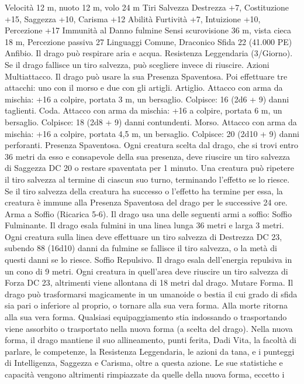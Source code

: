 \begin{multicols}{2}
Velocità 12 m, nuoto 12 m, volo 24 m
Tiri Salvezza Destrezza +7, Costituzione +15, Saggezza +10,
Carisma +12
Abilità Furtività +7, Intuizione +10, Percezione +17
Immunità al Danno fulmine
Sensi scurovisione 36 m, vista cieca 18 m, Percezione passiva 27
Linguaggi Comune, Draconico
Sfida 22 (41.000 PE)
Anfibio. Il drago può respirare aria e acqua.
Resistenza Leggendaria (3/Giorno). Se il drago fallisce un tiro
salvezza, può scegliere invece di riuscire.
Azioni
Multiattacco. Il drago può usare la sua Presenza Spaventosa. Poi
effettuare tre attacchi: uno con il morso e due con gli artigli.
Artiglio. Attacco con arma da mischia: +16 a colpire, portata 3
m, un bersaglio.
Colpisce: 16 (2d6 + 9) danni taglienti.
Coda. Attacco con arma da mischia: +16 a colpire, portata 6 m,
un bersaglio.
Colpisce: 18 (2d8 + 9) danni contundenti.
Morso. Attacco con arma da mischia: +16 a colpire, portata 4,5
m, un bersaglio.
Colpisce: 20 (2d10 + 9) danni perforanti.
Presenza Spaventosa. Ogni creatura scelta dal drago, che si trovi
entro 36 metri da esso e consapevole della sua presenza, deve
riuscire un tiro salvezza di Saggezza DC 20 o restare spaventata per
1 minuto. Una creatura può ripetere il tiro salvezza al termine di
ciascun suo turno, terminando l’effetto se lo riesce. Se il tiro salvezza
della creatura ha successo o l’effetto ha termine per essa, la creatura è
immune alla Presenza Spaventosa del drago per le successive 24 ore.
Arma a Soffio (Ricarica 5-6). Il drago usa una delle seguenti armi
a soffio:
Soffio Fulminante. Il drago esala fulmini in una linea lunga 36 metri
e larga 3 metri. Ogni creatura sulla linea deve effettuare un tiro
salvezza di Destrezza DC 23, subendo 88 (16d10) danni da fulmine
se fallisce il tiro salvezza, o la metà di questi danni se lo riesce.
Soffio Repulsivo. Il drago esala dell’energia repulsiva in un cono di 9
metri. Ogni creatura in quell’area deve riuscire un tiro salvezza di
Forza DC 23, altrimenti viene allontana di 18 metri dal drago.
Mutare Forma. Il drago può trasformarsi magicamente in un
umanoide o bestia il cui grado di sfida sia pari o inferiore al proprio,
o tornare alla sua vera forma. Alla morte ritorna alla sua vera forma.
Qualsiasi equipaggiamento stia indossando o trasportando viene
assorbito o trasportato nella nuova forma (a scelta del drago).
Nella nuova forma, il drago mantiene il suo allineamento, punti
ferita, Dadi Vita, la facoltà di parlare, le competenze, la Resistenza
Leggendaria, le azioni da tana, e i punteggi di Intelligenza, Saggezza
e Carisma, oltre a questa azione. Le sue statistiche e capacità
vengono altrimenti rimpiazzate da quelle della nuova forma, eccetto i

\end{multicols}
